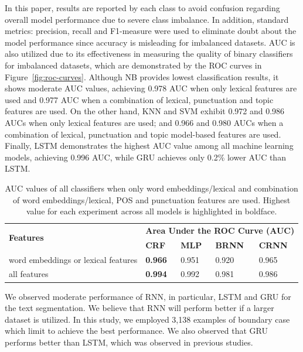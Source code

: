 \documentclass{amia}
\begin{document}
In this paper, results are reported by each class to avoid confusion regarding overall model performance due to severe class imbalance. In addition, standard metrics: precision, recall and F1-measure were used to eliminate doubt about the model performance since accuracy is misleading for imbalanced datasets. AUC is also utilized due to its effectiveness in measuring the quality of binary classifiers for imbalanced datasets\cite{hu2015kernelized}, which are demonstrated by the ROC curves in Figure~\ref{fig:roc-curves}. Although NB provides lowest classification results, it shows moderate AUC values, achieving 0.978 AUC when only lexical features are used and 0.977 AUC when a combination of lexical, punctuation and topic features are used. On the other hand, KNN and SVM exhibit 0.972 and 0.986 AUCs when only lexical features are used; and 0.966 and 0.980 AUCs when a combination of lexical, punctuation and topic model-based features are used. Finally, LSTM demonstrates the highest AUC value among all machine learning models, achieving 0.996 AUC, while GRU achieves only 0.2\% lower AUC than LSTM. \\ 

\begin{table}[ht]
\centering
\caption{AUC values of all classifiers when only word embeddings/lexical and combination of word embeddings/lexical, POS and punctuation features are used. Highest value for each experiment across all models is highlighted in boldface.}
\label{tab:result_roc}
 \begin{tabular}{|l|l|l|l|l|}
  \hline
\multirow{2}{*}{\textbf{Features}} & \multicolumn{4}{|c|}{\textbf{Area Under the ROC Curve (AUC)}} \\\cline{2-5}
 & \textbf{CRF} & \textbf{MLP}  & \textbf{BRNN} & \textbf{CRNN} \\ \hline      
 word embeddings or lexical features & \textbf{0.966} & 0.951 & 0.920 & 0.965 \\ \hline
 all features & \textbf{0.994} & 0.992 & 0.981 & 0.986 \\ \hline
  \end{tabular}
\end{table}      


We observed moderate performance of RNN, in particular, LSTM and GRU for the text segmentation. We believe that RNN will perform better if a larger dataset is utilized. In this study, we employed 3,138 examples of boundary case which limit to achieve the best performance. We also observed that GRU performs better than LSTM, which was observed in previous studies\cite{chung2014empirical}.
\end{document}
